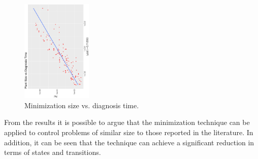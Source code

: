 \begin{figure}[bt]
	\centering
	\SmallPicture
	\includegraphics[width=0.3\textwidth, angle=-90]{../experimental_setting/tmp_results/size_vs_diag_time.ps}
	\vspace*{-2mm}
	\caption{Minimization size vs. diagnosis time.}
	\label{fig:size_vs_diag_time}
	\vspace*{-4mm}
	\MediumPicture
\end{figure}


From the results it is possible to argue that the minimization technique can be applied to control problems of similar size to those reported in the literature. 
In addition, it can be seen that the technique can achieve a significant reduction in terms of states and transitions.


